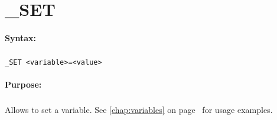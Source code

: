 
\newpage
\section{\_SET}
\label{cmd:_SET}

\paragraph{Syntax:}
\subparagraph{}
\texttt{\_SET <variable>=<value>}

\paragraph{Purpose:}
\subparagraph{}
Allows to set a variable. See \autoref{chap:variables} 
on page~\pageref{chap:variables} for usage examples.